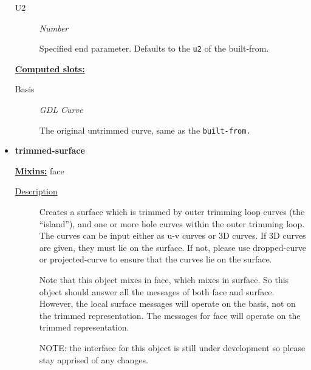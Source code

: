 \documentclass [11pt]{book}
\begin{document}
\begin{itemize}
\begin{description}
\item [U2]
\emph{Number}

 Specified end parameter. Defaults to the \texttt{u2} of the built-from.




\end{description}






\textbf{
\underline{Computed slots:}}

\begin{description}

\item [Basis]
\emph{GDL Curve}

 The original untrimmed curve, same as the \texttt{built-from.}




\end{description}







\item {}
\label{prim:trimmed-surface}
\textbf{trimmed-surface}


\textbf{
\underline{Mixins:}} face





\begin{description}

\item [
\underline{Description}]


Creates a surface which is trimmed by outer trimming loop curves (the ``island''), and one or more 
hole curves within the outer trimming loop. The curves can be input either as u-v curves or 3D curves.
If 3D curves are given, they must lie on the surface. If not, please use dropped-curve or projected-curve
to ensure that the curves lie on the surface.




Note that this object mixes in face, which mixes in surface. So this object should answer all the messages
of both face and surface. However, the local surface messages will operate on the basis, not on the trimmed 
representation. The messages for face will operate on the trimmed representation.






NOTE: the interface for this object is still under development so please stay apprised of any changes.






\end{description}
\end{itemize}
\end{document}
